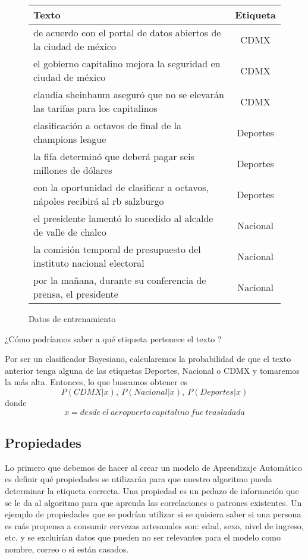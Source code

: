 \begin{figure}[H]
  \begin{center}
    \begin{tabular}{ l | c }
      Texto & Etiqueta \\ \hline
      de acuerdo con el portal de datos abiertos de la ciudad de méxico & CDMX  \\ \hline
      el gobierno capitalino mejora la seguridad en ciudad de méxico & CDMX  \\ \hline
      claudia sheinbaum aseguró que no se elevarán las tarifas para los capitalinos & CDMX  \\ \hline
      clasificación a octavos de final de la champions league & Deportes\\ \hline
      la fifa determinó que deberá pagar seis millones de dólares & Deportes  \\ \hline
      con la oportunidad de clasificar a octavos, nápoles recibirá al rb salzburgo & Deportes  \\ \hline
      el presidente lamentó lo sucedido al alcalde de valle de chalco & Nacional  \\ \hline
      la comisión temporal de presupuesto del instituto nacional electoral & Nacional  \\ \hline
      por la mañana, durante su conferencia de prensa, el presidente & Nacional  \\
    \end{tabular}
  \end{center}
  \caption{Datos de entrenamiento}
\end{figure}

¿Cómo podríamos saber a qué etiqueta pertenece el texto ?

Por ser un clasificador Bayesiano, calcularemos la probabilidad de que el texto anterior tenga alguna de las etiquetas Deportes, Nacional o CDMX y tomaremos la más alta. Entonces, lo que buscamos obtener es
\[P( CDMX | x ), \ P( Nacional | x ), \ P( Deportes | x )\]
donde
\[x = desde \ el \ aeropuerto \ capitalino \ fue \ trasladada \]

\subsection{Propiedades}

Lo primero que debemos de hacer al crear un modelo de Aprendizaje Automático es definir qué propiedades se utilizarán para que nuestro algoritmo pueda determinar la etiqueta correcta. Una propiedad es un pedazo de información que se le da al algoritmo para que aprenda las correlaciones o patrones existentes. Un ejemplo de propiedades que se podrían utilizar si se quisiera saber si una persona es más propensa a consumir cervezas artesanales son: edad, sexo, nivel de ingreso, etc. y se excluirían datos que pueden no ser relevantes para el modelo como nombre, correo o si están casados.

